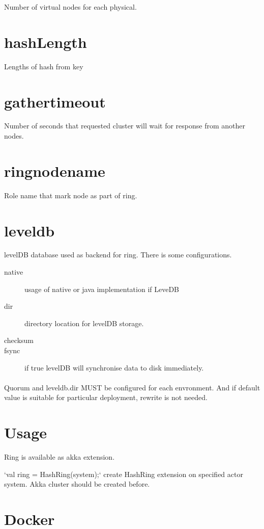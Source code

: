 Number of virtual nodes for each physical.

\section*{hashLength}

Lengths of hash from key

\section*{gather\-timeout}
Number of seconds that requested cluster will wait for response from another nodes.

\section*{ring\-node\-name}
Role name that mark node as part of ring.

\section*{leveldb}
levelDB database used as backend for ring. There is some configurations.

\begin{description}
\item[native] usage of native or java implementation if LeveDB
\item[dir] directory location for levelDB storage.
\item[checksum]
\item[fsync] if true levelDB will synchronise data to disk immediately.
\end{description}

\paragraph{}
Quorum and leveldb.dir MUST be configured for each envronment.
And if default value is suitable for particular deployment, rewrite is not needed.

\section*{Usage}

Ring is available as akka extension.

`val ring = HashRing(system);` \- create HashRing extension on specified actor system. Akka cluster should be created before.

\section*{Docker}
